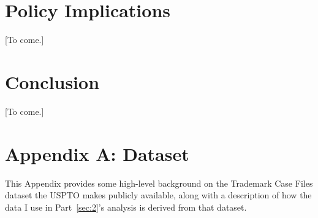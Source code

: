 \documentclass[letterpaper, 11pt, oneside]{article}
\begin{document}
\section{Policy Implications} \label{sec:3}


[To come.]

\section*{Conclusion}

[To come.]

\newpage

\appendix
\section*{Appendix A: Dataset}


This Appendix provides some high-level background on the Trademark Case Files dataset the USPTO makes publicly available, along with a description of how the data I use in Part~\ref{sec:2}'s analysis is derived from that dataset.
\end{document}
